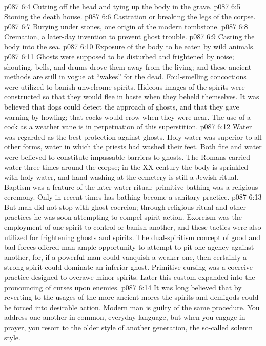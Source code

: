 \vs p087 6:4 \bibnobreakspace Cutting off the head and tying up the body in the grave.
\vs p087 6:5 \bibnobreakspace Stoning the death house.
\vs p087 6:6 \bibnobreakspace Castration or breaking the legs of the corpse.
\vs p087 6:7 \bibnobreakspace Burying under stones, one origin of the modern tombstone.
\vs p087 6:8 \bibnobreakspace Cremation, a later\hyp{}day invention to prevent ghost trouble.
\vs p087 6:9 \bibnobreakspace Casting the body into the sea.
\vs p087 6:10 \bibnobreakspace Exposure of the body to be eaten by wild animals.
\vs p087 6:11 \pc Ghosts were supposed to be disturbed and frightened by noise; shouting, bells, and drums drove them away from the living; and these ancient methods are still in vogue at “wakes” for the dead. Foul\hyp{}smelling concoctions were utilized to banish unwelcome spirits. Hideous images of the spirits were constructed so that they would flee in haste when they beheld themselves. It was believed that dogs could detect the approach of ghosts, and that they gave warning by howling; that cocks would crow when they were near. The use of a cock as a weather vane is in perpetuation of this superstition.
\vs p087 6:12 Water was regarded as the best protection against ghosts. Holy water was superior to all other forms, water in which the priests had washed their feet. Both fire and water were believed to constitute impassable barriers to ghosts. The Romans carried water three times around the corpse; in the XX century the body is sprinkled with holy water, and hand washing at the cemetery is still a Jewish ritual. Baptism was a feature of the later water ritual; primitive bathing was a religious ceremony. Only in recent times has bathing become a sanitary practice.
\vs p087 6:13 But man did not stop with ghost coercion; through religious ritual and other practices he was soon attempting to compel spirit action. Exorcism was the employment of one spirit to control or banish another, and these tactics were also utilized for frightening ghosts and spirits. The dual\hyp{}spiritism concept of good and bad forces offered man ample opportunity to attempt to pit one agency against another, for, if a powerful man could vanquish a weaker one, then certainly a strong spirit could dominate an inferior ghost. Primitive cursing was a coercive practice designed to overawe minor spirits. Later this custom expanded into the pronouncing of curses upon enemies.
\vs p087 6:14 It was long believed that by reverting to the usages of the more ancient mores the spirits and demigods could be forced into desirable action. Modern man is guilty of the same procedure. You address one another in common, everyday language, but when you engage in prayer, you resort to the older style of another generation, the so\hyp{}called solemn style.
